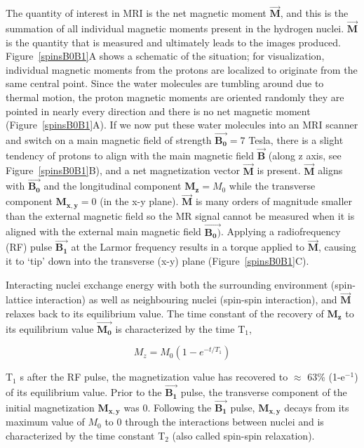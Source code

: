 The quantity of interest in MRI is the net magnetic moment  $\vec{\mathbf{M}}$, and this is the summation of all individual magnetic moments present in the hydrogen nuclei. 
$\vec{\mathbf{M}}$ is the quantity that is measured and ultimately leads to the images produced.
Figure~\ref{spinsB0B1}A shows a schematic of the situation; for visualization, individual magnetic moments from the protons are localized to originate from the same central point.
Since the water molecules are tumbling around due to thermal motion, the proton magnetic moments are oriented randomly they are pointed in nearly every direction and there is no net magnetic moment (Figure~\ref{spinsB0B1}A).
If we now put these water molecules into an MRI scanner and switch on a main magnetic field of strength $\vec{\mathbf{B_0}} = 7$ Tesla, there is a slight tendency of protons to align with the main magnetic field $\vec{\mathbf{B}}$ (along z axis, see Figure~\ref{spinsB0B1}B), and a net magnetization vector $\vec{\mathbf{M}}$ is present.
$\vec{\mathbf{M}}$ aligns with $\vec{\mathbf{B_0}}$ and the longitudinal component $\mathbf{M_z} = M_0$ while the transverse component $\mathbf{M_{x,y}} = 0$ (in the x-y plane).
$\vec{\mathbf{M}}$ is many orders of magnitude smaller than the external magnetic field so the MR signal cannot be measured when it is aligned with the external main magnetic field $\vec{\mathbf{B_0)}}$. 
Applying a radiofrequency (RF) pulse $\vec{\mathbf{B_1}}$ at the Larmor frequency results in a torque applied to $\vec{\mathbf{M}}$, causing it to `tip' down into the transverse (x-y) plane (Figure~\ref{spinsB0B1}C).

Interacting nuclei exchange energy with both the surrounding environment (spin-lattice interaction) as well as neighbouring nuclei (spin-spin interaction), and $\vec{\mathbf{M}}$ relaxes back to its equilibrium value. 
The time constant of the recovery of $\mathbf{M_z}$ to its equilibrium value $\vec{\mathbf{M_0}}$ is characterized by the time T$_1$,

\begin{equation}
	M_z = M_0(1-e^{-t/T_1})
	\label{T1}
\end{equation}

T$_1$ s after the RF pulse, the magnetization value has recovered to $\approx$ 63\% (1-e$^{-1}$) of its equilibrium value.
Prior to the $\vec{\mathbf{B_1}}$ pulse, the transverse component of the initial magnetization $\mathbf{M_{x,y}}$ was 0.
Following the $\vec{\mathbf{B_1}}$ pulse, $\mathbf{M_{x,y}}$ decays from its maximum value of $M_0$ to 0 through the interactions between nuclei and is characterized by the time constant T$_2$ (also called spin-spin relaxation).
		
